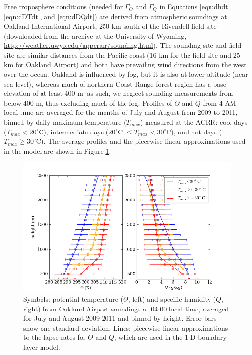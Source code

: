 Free troposphere conditions (needed for $\Gamma_{\Theta}$ and $\Gamma_Q$ in Equations \ref{eqn:dhdt}, \ref{eqn:dDTdt}, and \ref{eqn:dDQdt}) are derived from atmospheric soundings at Oakland International Airport, 250 km south of the Rivendell field site (downloaded from the archive at the University of Wyoming, \url{http://weather.uwyo.edu/upperair/sounding.html}).  The sounding site and field site are similar distances from the Pacific coast (16 km for the field site and 25 km for Oakland Airport) and both have prevailing wind directions from the west over the ocean.  Oakland is influenced by fog, but it is also at lower altitude (near sea level), whereas much of northern Coast Range forest region has a base elevation of at least 400 m; as such, we neglect sounding measurements from below 400 m, thus excluding much of the fog.  Profiles of $\Theta$ and $Q$ from 4 AM local time are averaged for the months of July and August from 2009 to 2011, binned by daily maximum temperature ($T_{max}$) measured at the ACRR: cool days ($T_{max} < 20^{\circ}$C), intermediate days ($20^{\circ}$C $\le T_{max} < 30^{\circ}$C), and hot days ($T_{max} \ge 30^{\circ}$C).  The average profiles and the piecewise linear approximations used in the model are shown in Figure \ref{fig:BL_LapseRates}.

\begin{figure}[here]
\includegraphics[width=1\textwidth]{ch2-BL/figures/fitted_lapserates_theta_Q_onefig.png}
\caption{Symbols: potential temperature ($\Theta$, left) and specific humidity ($Q$, right) from Oakland Airport soundings at 04:00 local time, averaged for July and August 2009-2011 and binned by height.  Error bars show one standard deviation.  Lines: piecewise linear approximations to the lapse rates for $\Theta$ and $Q$, which are used in the 1-D boundary layer model.}
\label{fig:BL_LapseRates}
\end{figure}

